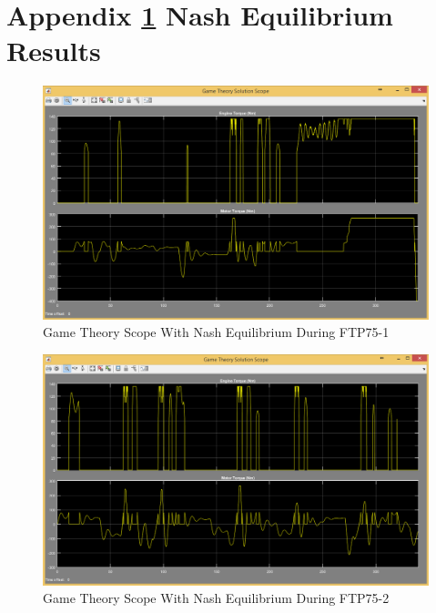 \appendix
\chapter{Appendix \ref{app:1} Nash Equilibrium Results}
\label{app:1}


\begin{figure}[h]
\centering
\includegraphics[scale=0.51]{figures/NashEquilibrium/FTP75-1/gameTheory13Juni}
\caption{Game Theory Scope With Nash Equilibrium During FTP75-1}
\label{fig:gtne1}
\end{figure}



\begin{figure}[h]
\centering
\includegraphics[scale=0.49]{figures/NashEquilibrium/FTP75-2/gameTheory13Juni}
\caption{Game Theory Scope With Nash Equilibrium During FTP75-2}
\label{fig:gtne2}
\end{figure}



